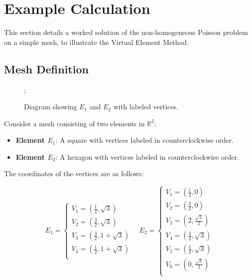 \documentclass{article}
\begin{document}


\section{Example Calculation}


This section details a worked solution of the non-homogeneous Poisson problem on a simple mesh, to illustrate the Virtual Element Method.

\subsection{Mesh Definition}

\begin{figure}[ht!]
    \centering
    ;
    \caption{Diagram showing $E_1$ and $E_2$ with labeled vertices.}
    \label{docs/LaTeX/diagram}
\end{figure}




Consider a mesh consisting of two elements in $\mathbb{R}^2$:

\begin{itemize}
    \item \textbf{Element $E_1$}: A square with vertices labeled in counterclockwise order.
    \item \textbf{Element $E_2$}: A hexagon with vertices labeled in counterclockwise order.
\end{itemize}

The coordinates of the vertices are as follows:

$$E_1 = \begin{cases}
    V_1 = (\frac{1}{2},\sqrt{3}) \\
    V_2 = (\frac{3}{2},\sqrt{3}) \\
    V_3 = (\frac{3}{2},1+\sqrt{3}) \\ 
    V_4 = (\frac{1}{2},1+\sqrt{3}) \\
\end{cases}
\quad
E_2 = \begin{cases}
    V_1 = (\frac{1}{2},0) \\ 
    V_2 = (\frac{3}{2},0) \\ 
    V_3 = (2,\frac{\sqrt{3}}{2}) \\
    V_4 = (\frac{3}{2},\sqrt{3}) \\
    V_5 = (\frac{1}{2}, \sqrt{3}) \\ 
    V_6 = (0, \frac{\sqrt{3}}{2}) \\
\end{cases}$$\\
\end{document}
